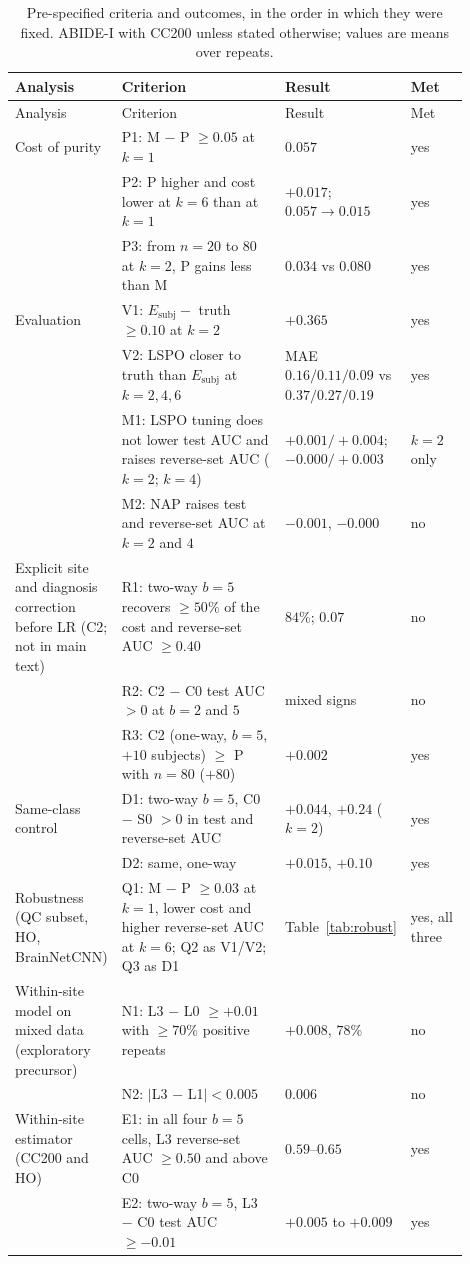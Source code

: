 {\footnotesize\setlength{\tabcolsep}{3pt}
\begin{longtable}{>{\raggedright}p{0.19\linewidth}>{\raggedright}p{0.38\linewidth}>{\raggedright}p{0.2\linewidth}>{\raggedright\arraybackslash}p{0.13\linewidth}}
\caption{Pre-specified criteria and outcomes, in the order in which they were fixed. ABIDE-I with CC200 unless stated otherwise; values are means over repeats.}\label{tab:criteria}\\
\toprule
Analysis & Criterion & Result & Met\\
\midrule
\endfirsthead
\toprule
Analysis & Criterion & Result & Met\\
\midrule
\endhead
\bottomrule
\endfoot
Cost of purity & P1: M $-$ P $\ge0.05$ at $k=1$ & $0.057$ & yes\tabularnewline
 & P2: P higher and cost lower at $k=6$ than at $k=1$ & $+0.017$; $0.057\to0.015$ & yes\tabularnewline
 & P3: from $n=20$ to $80$ at $k=2$, P gains less than M & $0.034$ vs $0.080$ & yes\tabularnewline
Evaluation & V1: $E_{\mathrm{subj}}-$ truth $\ge0.10$ at $k=2$ & $+0.365$ & yes\tabularnewline
 & V2: LSPO closer to truth than $E_{\mathrm{subj}}$ at $k=2,4,6$ & MAE $0.16/0.11/0.09$ vs $0.37/0.27/0.19$ & yes\tabularnewline
 & M1: LSPO tuning does not lower test AUC and raises reverse-set AUC ($k=2$; $k=4$) & $+0.001/+0.004$; $-0.000/+0.003$ & $k=2$ only\tabularnewline
 & M2: NAP raises test and reverse-set AUC at $k=2$ and $4$ & $-0.001$, $-0.000$ & no\tabularnewline
Explicit site and diagnosis correction before LR (C2; not in main text) & R1: two-way $b=5$ recovers $\ge50\%$ of the cost and reverse-set AUC $\ge0.40$ & $84\%$; $0.07$ & no\tabularnewline
 & R2: C2 $-$ C0 test AUC $>0$ at $b=2$ and $5$ & mixed signs & no\tabularnewline
 & R3: C2 (one-way, $b=5$, $+10$ subjects) $\ge$ P with $n=80$ ($+80$) & $+0.002$ & yes\tabularnewline
Same-class control & D1: two-way $b=5$, C0 $-$ S0 $>0$ in test and reverse-set AUC & $+0.044$, $+0.24$ ($k=2$) & yes\tabularnewline
 & D2: same, one-way & $+0.015$, $+0.10$ & yes\tabularnewline
Robustness (QC subset, HO, BrainNetCNN) & Q1: M $-$ P $\ge0.03$ at $k=1$, lower cost and higher reverse-set AUC at $k=6$; Q2 as V1/V2; Q3 as D1 & Table~\ref{tab:robust} & yes, all three\tabularnewline
Within-site model on mixed data (exploratory precursor) & N1: L3 $-$ L0 $\ge+0.01$ with $\ge70\%$ positive repeats & $+0.008$, $78\%$ & no\tabularnewline
 & N2: $|$L3 $-$ L1$|<0.005$ & $0.006$ & no\tabularnewline
Within-site estimator (CC200 and HO) & E1: in all four $b=5$ cells, L3 reverse-set AUC $\ge0.50$ and above C0 & $0.59$--$0.65$ & yes\tabularnewline
 & E2: two-way $b=5$, L3 $-$ C0 test AUC $\ge-0.01$ & $+0.005$ to $+0.009$ & yes\tabularnewline

\end{longtable}}

